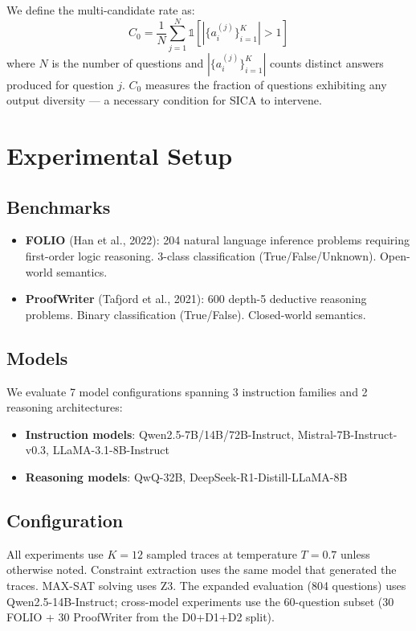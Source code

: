 \documentclass[11pt]{article}
\begin{document}
We define the multi-candidate rate as:
\begin{equation}
    C_0 = \frac{1}{N} \sum_{j=1}^N \mathbb{1}\left[|\{a_i^{(j)}\}_{i=1}^K| > 1\right]
\end{equation}
where $N$ is the number of questions and $|\{a_i^{(j)}\}_{i=1}^K|$ counts distinct answers produced for question $j$. $C_0$ measures the fraction of questions exhibiting any output diversity --- a necessary condition for SICA to intervene.

\section{Experimental Setup}

\subsection{Benchmarks}
\begin{itemize}
    \item \textbf{FOLIO} (Han et al., 2022): 204 natural language inference problems requiring first-order logic reasoning. 3-class classification (True/False/Unknown). Open-world semantics.
    \item \textbf{ProofWriter} (Tafjord et al., 2021): 600 depth-5 deductive reasoning problems. Binary classification (True/False). Closed-world semantics.
\end{itemize}

\subsection{Models}
We evaluate 7 model configurations spanning 3 instruction families and 2 reasoning architectures:
\begin{itemize}
    \item \textbf{Instruction models}: Qwen2.5-7B/14B/72B-Instruct, Mistral-7B-Instruct-v0.3, LLaMA-3.1-8B-Instruct
    \item \textbf{Reasoning models}: QwQ-32B, DeepSeek-R1-Distill-LLaMA-8B
\end{itemize}

\subsection{Configuration}
All experiments use $K=12$ sampled traces at temperature $T=0.7$ unless otherwise noted. Constraint extraction uses the same model that generated the traces. MAX-SAT solving uses Z3. The expanded evaluation (804 questions) uses Qwen2.5-14B-Instruct; cross-model experiments use the 60-question subset (30 FOLIO + 30 ProofWriter from the D0+D1+D2 split).
\end{document}
